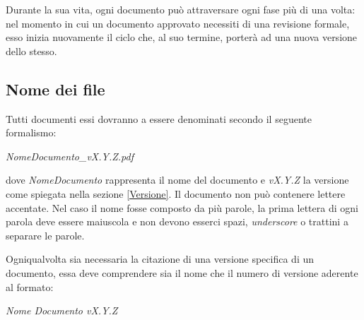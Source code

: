 \documentclass[12pt,a4paper]{article}
\begin{document}
Durante la sua vita, ogni documento può attraversare ogni fase più di una volta: nel momento in cui un documento approvato necessiti di una revisione formale, esso inizia nuovamente il ciclo che, al suo termine, porterà ad una nuova versione dello stesso.

\subsection{Nome dei file}

Tutti documenti essi dovranno a essere denominati secondo il seguente formalismo:
\begin{center}
	\emph{NomeDocumento\_vX.Y.Z.pdf}
\end{center}
dove \emph{NomeDocumento} rappresenta il nome del documento e \emph{vX.Y.Z} la versione come spiegata nella sezione \ref{Versione}. Il documento non può contenere lettere accentate. Nel caso il nome fosse composto da più parole, la prima lettera di ogni parola deve essere maiuscola e non devono esserci spazi, \emph{underscore} o trattini a separare le parole.

Ogniqualvolta sia necessaria la citazione di una versione specifica di un documento, essa deve comprendere sia il nome che il numero di versione aderente al formato:
\begin{center}
	\emph{Nome Documento vX.Y.Z}
\end{center}
\end{document}
